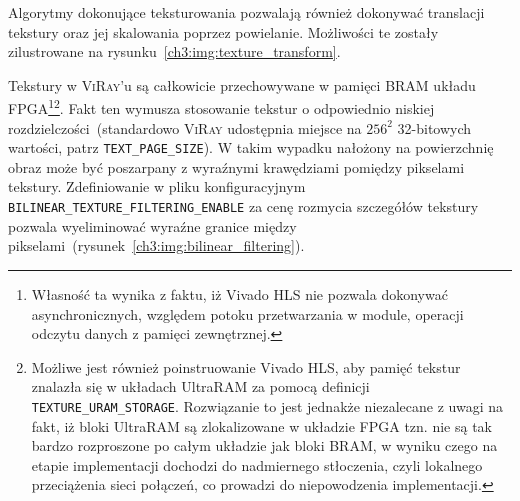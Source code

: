 \begin{enumerate}
\begin{itemize}
\end{itemize}

Algorytmy dokonujące teksturowania pozwalają również dokonywać translacji tekstury oraz jej skalowania poprzez powielanie. Możliwości te zostały zilustrowane na rysunku~\ref{ch3:img:texture_transform}.


Tekstury w \textsc{ViRay}'u są całkowicie przechowywane w pamięci BRAM układu FPGA\footnote{Własność ta wynika z faktu, iż Vivado HLS nie pozwala dokonywać asynchronicznych, względem potoku przetwarzania w module, operacji odczytu danych z pamięci zewnętrznej.}\footnote{Możliwe jest również poinstruowanie Vivado HLS, aby pamięć tekstur znalazła się w układach UltraRAM za pomocą definicji \texttt{TEXTURE\_URAM\_STORAGE}. Rozwiązanie to jest jednakże niezalecane z uwagi na fakt, iż bloki UltraRAM są zlokalizowane w układzie FPGA tzn. nie są tak bardzo rozproszone po całym układzie jak bloki BRAM, w wyniku czego na etapie implementacji dochodzi do nadmiernego stłoczenia, czyli lokalnego przeciążenia sieci połączeń, co prowadzi do niepowodzenia implementacji.}. Fakt ten wymusza stosowanie tekstur o odpowiednio niskiej rozdzielczości~(standardowo \textsc{ViRay} udostępnia miejsce na $256^2$ 32-bitowych wartości, patrz \texttt{TEXT\_PAGE\_SIZE}). W takim wypadku nałożony na powierzchnię obraz może być poszarpany z wyraźnymi krawędziami pomiędzy pikselami tekstury. Zdefiniowanie w pliku konfiguracyjnym \texttt{BILINEAR\_TEXTURE\_FILTERING\_ENABLE} za cenę rozmycia szczegółów tekstury pozwala wyeliminować wyraźne granice między pikselami~(rysunek~\ref{ch3:img:bilinear_filtering}). 



\end{enumerate}
